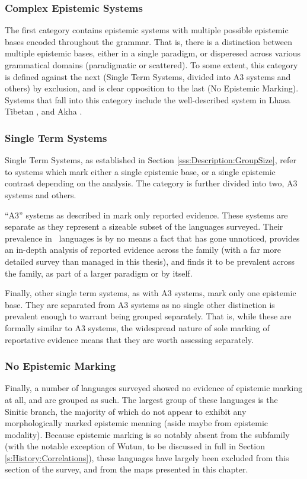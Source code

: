 \subsubsection{Complex Epistemic Systems}
The first category contains epistemic systems with multiple possible epistemic bases encoded throughout the grammar. That is, there is a distinction between multiple epistemic bases, either in a single paradigm, or disperesed across various grammatical domains (paradigmatic or scattered). To some extent, this category is defined against the next (Single Term Systems, divided into A3 systems and others) by exclusion, and is clear opposition to the last (No Epistemic Marking). Systems that fall into this category include the well-described system in Lhasa Tibetan \cite{DeLancey2017Tibetan}, and Akha \cite{Thurgood1986}.
\subsubsection{Single Term Systems}
Single Term Systems, as established in Section \ref{sss:Description:GroupSize}, refer to systems which mark either a single epistemic base, or a single epistemic contrast depending on the analysis. The category is further divided into two, A3 systems and others.

``A3'' systems as described in  mark only reported evidence. These systems are separate as they represent a sizeable subset of the languages surveyed. Their prevalence in \lfam\ languages is by no means a fact that has gone unnoticed,  provides an in-depth analysis of reported evidence across the family (with a far more detailed survey than managed in this thesis), and finds it to be prevalent across the family, as part of a larger paradigm or by itself.

Finally, other single term systems, as with A3 systems, mark only one epistemic base. They are separated from A3 systems as no single other distinction is prevalent enough to warrant being grouped separately. That is, while these are formally similar to A3 systems, the widespread nature of sole marking of reportative evidence means that they are worth assessing separately. 
\subsubsection{No Epistemic Marking}
Finally, a number of languages surveyed showed no evidence of epistemic marking at all, and are grouped as such. The largest group of these languages is the Sinitic branch, the majority of which do not appear to exhibit any morphologically marked epistemic meaning (aside maybe from epistemic modality). Because epistemic marking is so notably absent from the subfamily (with the notable exception of Wutun, to be discussed in full in Section \ref{s:History:Correlations}), these languages have largely been excluded from this section of the survey, and from the maps presented in this chapter.

